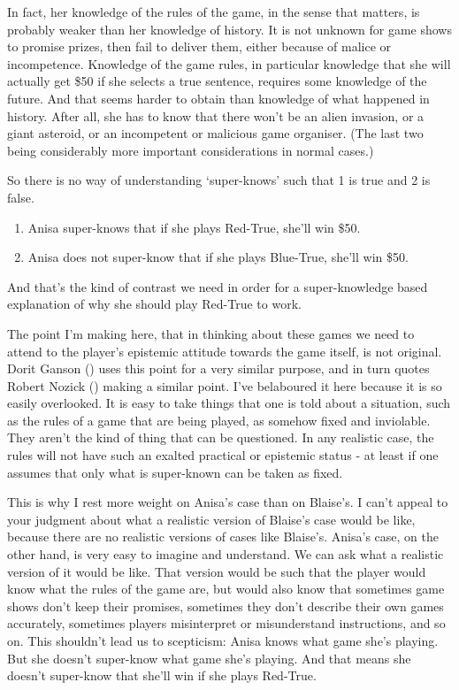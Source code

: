 \documentclass[
  12pt,
  letterpaper,
]{scrbook}
\providecommand{\tightlist}{%
  \setlength{\itemsep}{0pt}\setlength{\parskip}{0pt}}\usepackage{longtable,booktabs,array}
\begin{document}
In fact, her knowledge of the rules of the game, in the sense that
matters, is probably weaker than her knowledge of history. It is not
unknown for game shows to promise prizes, then fail to deliver them,
either because of malice or incompetence. Knowledge of the game rules,
in particular knowledge that she will actually get \$50 if she selects a
true sentence, requires some knowledge of the future. And that seems
harder to obtain than knowledge of what happened in history. After all,
she has to know that there won't be an alien invasion, or a giant
asteroid, or an incompetent or malicious game organiser. (The last two
being considerably more important considerations in normal cases.)

So there is no way of understanding `super-knows' such that 1 is true
and 2 is false.

\begin{enumerate}
\def\labelenumi{\arabic{enumi}.}
\tightlist
\item
  Anisa super-knows that if she plays Red-True, she'll win \$50.
\item
  Anisa does not super-know that if she plays Blue-True, she'll win
  \$50.
\end{enumerate}

And that's the kind of contrast we need in order for a super-knowledge
based explanation of why she should play Red-True to work.

The point I'm making here, that in thinking about these games we need to
attend to the player's epistemic attitude towards the game itself, is
not original. Dorit Ganson () uses this
point for a very similar purpose, and in turn quotes Robert Nozick
() making a similar point. I've
belaboured it here because it is so easily overlooked. It is easy to
take things that one is told about a situation, such as the rules of a
game that are being played, as somehow fixed and inviolable. They aren't
the kind of thing that can be questioned. In any realistic case, the
rules will not have such an exalted practical or epistemic status - at
least if one assumes that only what is super-known can be taken as
fixed.

This is why I rest more weight on Anisa's case than on Blaise's. I can't
appeal to your judgment about what a realistic version of Blaise's case
would be like, because there are no realistic versions of cases like
Blaise's. Anisa's case, on the other hand, is very easy to imagine and
understand. We can ask what a realistic version of it would be like.
That version would be such that the player would know what the rules of
the game are, but would also know that sometimes game shows don't keep
their promises, sometimes they don't describe their own games
accurately, sometimes players misinterpret or misunderstand
instructions, and so on. This shouldn't lead us to scepticism: Anisa
knows what game she's playing. But she doesn't super-know what game
she's playing. And that means she doesn't super-know that she'll win if
she plays Red-True.
\end{document}
